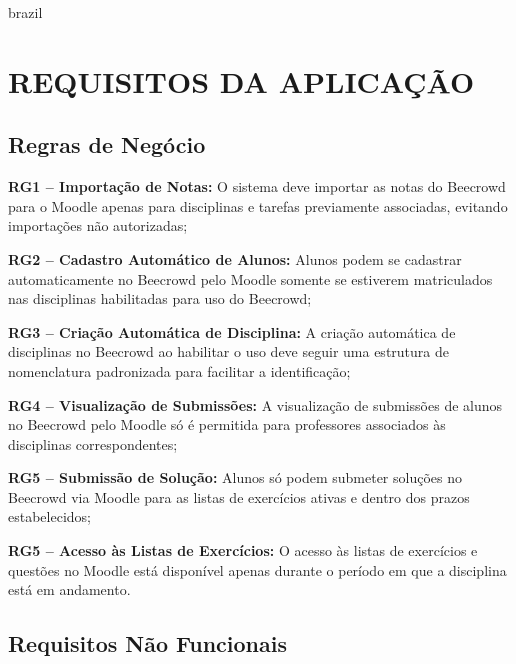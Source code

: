 \begin{otherlanguage*}{brazil}
\section{REQUISITOS DA APLICAÇÃO}

\subsection{Regras de Negócio}

\textbf{RG1 – Importação de Notas:} O sistema deve importar as notas do Beecrowd para o Moodle apenas para disciplinas e tarefas previamente associadas, evitando importações não autorizadas;

\vspace{12pt}

\textbf{RG2 – Cadastro Automático de Alunos:} Alunos podem se cadastrar automaticamente no Beecrowd pelo Moodle somente se estiverem matriculados nas disciplinas habilitadas para uso do Beecrowd;

\vspace{12pt}

\textbf{RG3 – Criação Automática de Disciplina:} A criação automática de disciplinas no Beecrowd ao habilitar o uso deve seguir uma estrutura de nomenclatura padronizada para facilitar a identificação;

\vspace{12pt}

\textbf{RG4 – Visualização de Submissões:} A visualização de submissões de alunos no Beecrowd pelo Moodle só é permitida para professores associados às disciplinas correspondentes;

\vspace{12pt}

\textbf{RG5 – Submissão de Solução:} Alunos só podem submeter soluções no Beecrowd via Moodle para as listas de exercícios ativas e dentro dos prazos estabelecidos;

\vspace{12pt}

\textbf{RG5 – Acesso às Listas de Exercícios:} O acesso às listas de exercícios e questões no Moodle está disponível apenas durante o período em que a disciplina está em andamento.

\vspace{12pt}

\subsection{Requisitos Não Funcionais}


\end{otherlanguage*}
